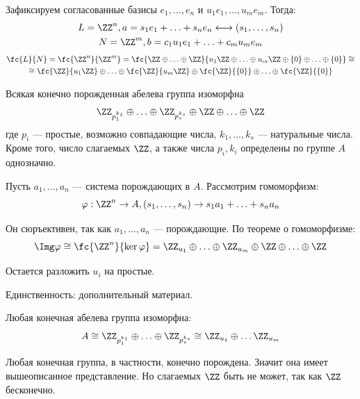 Зафиксируем согласованные базисы \( e_1, \ldots, e_n \) и \( u_1 e_1, \ldots, u_m e_m \).
Тогда:
\begin{gather*}
    L = \ZZ^n, a = s_1 e_1 + \ldots + s_n e_n \longleftrightarrow (s_1, \ldots, s_n)
    \\
    N = \ZZ^m, b = c_1 u_1 e_1 + \ldots + c_m u_m e_m
\end{gather*}
\begin{gather*}
    \fc{L}{N}
    =
    \fc{\ZZ^n}{\ZZ^m}
    =
    \fc{ \ZZ \oplus \ldots \oplus \ZZ }{ u_1 \ZZ \oplus \ldots \oplus u_m \ZZ \oplus \{ 0 \} \oplus \ldots \oplus \{ 0 \} }
    \cong
    \\
    \cong
    \fc{\ZZ}{u_1 \ZZ} \oplus \ldots \oplus \fc{\ZZ}{u_m \ZZ} \oplus \fc{\ZZ}{ \{ 0 \} } \oplus \ldots \oplus \fc{\ZZ}{ \{ 0 \} }
\end{gather*}

\begin{thrm}{}{}
    Всякая конечно порожденная абелева группа изоморфна
    \[
        \ZZ_{p_1^{k_1}} \oplus \ldots \oplus \ZZ_{p_s^{k_s}} \oplus \ZZ \oplus \ldots \oplus \ZZ
    \]
    где \( p_i \) --- простые, возможно совпадающие числа,
    \( k_1, \ldots, k_s \) --- натуральные числа.
    Кроме того, число слагаемых \( \ZZ \), а также числа \( p_i, k_i \)
    определены по группе \( A \) однозначно.
\end{thrm}

Пусть \( a_1, \ldots, a_n \) --- система порождающих в \( A \).
Рассмотрим гомоморфизм:
\[
    \varphi : \ZZ^n \to A, (s_1, \ldots, s_n) \to s_1 a_1 + \ldots + s_n a_n
\]

Он сюръективен, так как \( a_1, \ldots, a_n \) --- порождающие.
По теореме о гомоморфизме:
\[
    \Img \varphi \cong \fc{\ZZ^n}{\ker \varphi}
    =
    \ZZ_{u_1} \oplus \ldots \oplus \ZZ_{u_m} \oplus \ZZ \oplus \ldots \oplus \ZZ
\]

Остается разложить \( u_i \) на простые.

Единственность: дополнительный материал.

\begin{coroll}{}{}
    Любая конечная абелева группа изоморфна:
    \[
        A \cong \ZZ_{p_1^{k_1}} \oplus \ldots \oplus \ZZ_{p_s^{k_s}} \cong \ZZ_{u_1} \oplus \ldots \ZZ_{u_m}
    \]
\end{coroll}

Любая конечная группа, в частности, конечно порождена.
Значит она имеет вышеописанное представление.
Но слагаемых \( \ZZ \) быть не может, так как \( \ZZ \) бесконечно.

